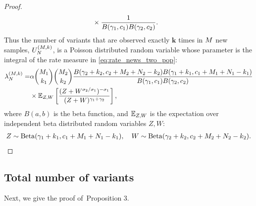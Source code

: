 \begin{proof}
\begin{equation}
\begin{aligned}
    &\times\frac{1}{B(\gamma_{1},c_{1})B(\gamma_{2},c_{2})}. \label{eq:rate_news_two_pop}
    \end{aligned}
\end{equation}
 Thus the number of variants that are observed exactly $\bm{k}$ times in $\vecfuturesamplesize$ new samples, $\news{\vecsamplesize}{\vecfuturesamplesize, \bm{k}}$, is a Poisson distributed random variable whose parameter is the integral of the rate measure in \cref{eq:rate_news_two_pop}:
\begin{align}
    \begin{split}
      \genericfreqnewsparam =&\mass\binom{\futuresamplesize{1}}{\occurrence{1}}\binom{\futuresamplesize{2}}{\occurrence{2}}\frac{B(\corr{2}+\occurrence{2},\conc{2}+\futuresamplesize{2}+\samplesize{2}-\occurrence{2})B(\corr{1}+\occurrence{1},\conc{1}+\futuresamplesize{1}+\samplesize{1}-\occurrence{1})}{B(\corr{1},\conc{1})B(\corr{2},\conc{2})}\\
    &\times\E_{Z,W}\left[\frac{(Z+W^{\rate{2}/\rate{1}})^{-\rate{1}}}{(Z+W)^{\corr{1}+\corr{2}}}\right],
    \end{split} \label{eq:expected_ktons}
\end{align}
where $B(a,b)$ is the beta function, and $\mathbb{E}_{Z,W}$ is the expectation over independent beta distributed random variables $Z, W$:
\begin{align*}
    Z\sim \mathrm{Beta}(\gamma_{1}+k_{1},c_{1}+M_{1}+N_{1}-k_{1}), \quad 
    W\sim \mathrm{Beta}(\gamma_{2}+k_{2},c_{2}+M_{2}+N_{2}-k_{2}).
\end{align*}
\end{proof}

\subsection{Total number of variants}
\label{sec:proof_total_number}
Next, we give the proof of~Proposition 3.


